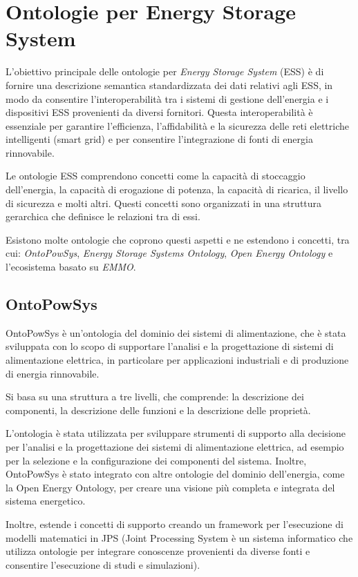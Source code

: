\chapter{Ontologie per Energy Storage System}

L'obiettivo principale delle ontologie per \textit{Energy Storage System} (ESS)
è di fornire una descrizione
semantica standardizzata dei dati relativi agli ESS, in modo da consentire
l'interoperabilità tra i sistemi di gestione dell'energia e i dispositivi ESS
provenienti da diversi fornitori. Questa interoperabilità è essenziale per
garantire l'efficienza, l'affidabilità e la sicurezza delle reti elettriche
intelligenti (smart grid) e per consentire l'integrazione di fonti di energia
rinnovabile.

Le ontologie ESS comprendono concetti come la capacità di stoccaggio
dell'energia, la capacità di erogazione di potenza, la capacità di ricarica, il
livello di sicurezza e
molti altri. Questi concetti sono organizzati in una struttura gerarchica che
definisce le relazioni tra di essi.

Esistono molte ontologie che coprono questi aspetti e ne estendono i concetti,
tra cui: \textit{OntoPowSys}, \textit{Energy Storage Systems Ontology},
\textit{Open Energy Ontology} e l'ecosistema basato su \textit{EMMO}.

\section{OntoPowSys}
OntoPowSys \cite{OntoPowSys} è un'ontologia del dominio dei sistemi di
alimentazione, che è stata
sviluppata con lo scopo di supportare l'analisi e la progettazione di sistemi
di alimentazione elettrica, in particolare per applicazioni industriali e di
produzione di energia rinnovabile.

Si basa su una struttura a tre livelli, che comprende:
la descrizione dei componenti, la descrizione delle funzioni e la descrizione
delle proprietà.

L'ontologia è stata utilizzata per sviluppare strumenti di supporto alla
decisione per l'analisi e la progettazione dei sistemi di alimentazione
elettrica, ad esempio per la selezione e la configurazione dei componenti del
sistema. Inoltre, OntoPowSys è stato integrato con altre ontologie del dominio
dell'energia, come la Open Energy Ontology, per creare una visione più completa
e integrata del sistema energetico.

Inoltre, estende i concetti di supporto creando un framework per l'esecuzione
di modelli matematici in JPS (Joint Processing System è un sistema informatico
che
utilizza ontologie per integrare conoscenze provenienti da diverse fonti e
consentire l'esecuzione di studi e simulazioni).

